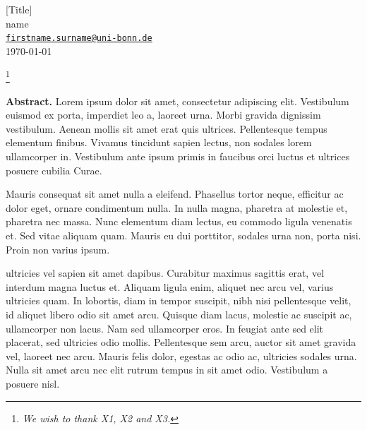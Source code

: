 \documentclass[11pt,a4paper]{article}
\newcommand\blfootnote[1]{%
  \begingroup
  \renewcommand\thefootnote{}\footnote{#1}%
  \addtocounter{footnote}{-1}%
  \endgroup
}
\begin{document}
\vspace*{0.5cm}

\thispagestyle{empty} %

\begin{center}
{\LARGE [Title]}\\[0.4cm]
 {\large name}\\[0.2cm]
  {\large \href{mailto:firstname.surname@uni-bonn.de}{\texttt{firstname.surname@uni-bonn.de}}}\\[0.2cm]
 {\large \today}\\
\end{center}

\blfootnote{\textsl{\textbullet \phantom{a} We wish to thank X1, X2 and X3.}}

\vspace*{-0.1cm}
\begin{center}
\begin{minipage}{0.9\textwidth}
\textbf{Abstract.} Lorem ipsum dolor sit amet, consectetur adipiscing elit. Vestibulum euismod ex porta, imperdiet leo a, laoreet urna. Morbi gravida dignissim vestibulum. Aenean mollis sit amet erat quis ultrices. Pellentesque tempus elementum finibus. Vivamus tincidunt sapien lectus, non sodales lorem ullamcorper in. Vestibulum ante ipsum primis in faucibus orci luctus et ultrices posuere cubilia Curae.
\end{minipage}
\end{center}


Mauris consequat sit amet nulla a eleifend. Phasellus tortor neque, efficitur ac dolor eget, ornare condimentum nulla. In nulla magna, pharetra at molestie et, pharetra nec massa. Nunc elementum diam lectus, eu commodo ligula venenatis et. Sed vitae aliquam quam. Mauris eu dui porttitor, sodales urna non, porta nisi. Proin non varius ipsum.

\cite{F1953} ultricies vel sapien sit amet dapibus. Curabitur maximus sagittis erat, vel interdum magna luctus et. Aliquam ligula enim, aliquet nec arcu vel, varius ultricies quam. In lobortis, diam in tempor suscipit, nibh nisi pellentesque velit, id aliquet libero odio sit amet arcu. Quisque diam lacus, molestie ac suscipit ac, ullamcorper non lacus. Nam sed ullamcorper eros. In feugiat ante sed elit placerat, sed ultricies odio mollis. Pellentesque sem arcu, auctor sit amet gravida vel, laoreet nec arcu. Mauris felis dolor, egestas ac odio ac, ultricies sodales urna. Nulla sit amet arcu nec elit rutrum tempus in sit amet odio. Vestibulum a posuere nisl.
\end{document}
